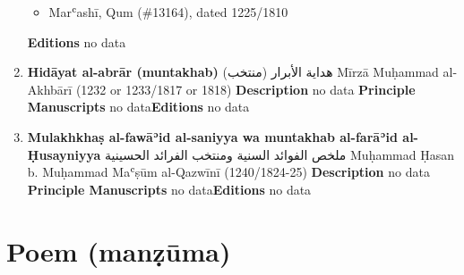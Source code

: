 \documentclass{article}
\begin{document}
\begin{enumerate}
\begin{itemize}
    \item Marʿashī, Qum (\#13164), dated 1225/1810
    \end{itemize}
\textbf{Editions}
\newline
no data\newline
      \item \textbf{Hidāyat al-abrār (muntakhab)}
        \newline
        \textarabic{هداية الأبرار (منتخب)}
        \newline
        Mīrzā Muḥammad al-Akhbārī
        \newline
        (1232 or 1233/1817 or 1818)
        \newline
        \newline
        \textbf{Description}
        \newline	
        no data
        \newline
        \newline
    \textbf{Principle Manuscripts}
\newline
no data\newline\textbf{Editions}
\newline
no data\newline
      \item \textbf{Mulakhkhaṣ al-fawāʾid al-saniyya wa muntakhab al-farāʾid al-Ḥusayniyya}
        \newline
        \textarabic{ملخص الفوائد السنية ومنتخب الفرائد الحسينية}
        \newline
        Muḥammad Ḥasan b. Muḥammad Maʿṣūm al-Qazwīnī
        \newline
        (1240/1824-25)
        \newline
        \newline
        \textbf{Description}
        \newline	
        no data
        \newline
        \newline
    \textbf{Principle Manuscripts}
\newline
no data\newline\textbf{Editions}
\newline
no data\newline\end{enumerate}\section{Poem (manẓūma)}
\end{document}
